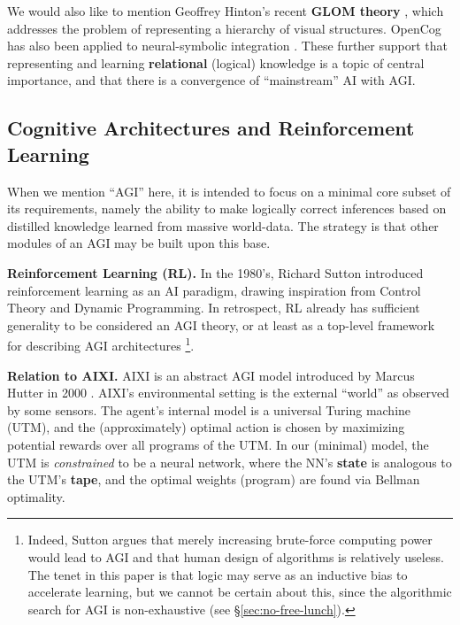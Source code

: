 \documentclass[orivec]{llncs}
\begin{document}
We would also like to mention Geoffrey Hinton's recent \textbf{GLOM theory} \cite{Hinton2021}, which addresses the problem of representing a hierarchy of visual structures.  OpenCog has also been applied to neural-symbolic integration \cite{Goertzel2009} \cite{Potapov2019}.  These further support that representing and learning \textbf{relational} (logical) knowledge is a topic of central importance, and that there is a convergence of ``mainstream'' AI with AGI.

\subsection{Cognitive Architectures and Reinforcement Learning}

When we mention ``AGI'' here, it is intended to focus on a minimal core subset of its requirements, namely the ability to make logically correct inferences based on distilled knowledge learned from massive world-data.  The strategy is that other modules of an AGI may be built upon this base.

\textbf{Reinforcement Learning (RL).}  In the 1980's, Richard Sutton \cite{Sutton1984} introduced reinforcement learning as an AI paradigm, drawing inspiration from Control Theory and Dynamic Programming.  In retrospect, RL already has sufficient generality to be considered an AGI theory, or at least as a top-level framework for describing AGI architectures \footnote{ Indeed, Sutton argues that merely increasing brute-force computing power would lead to AGI and that human design of algorithms is relatively useless.  The tenet in this paper is that logic may serve as an inductive bias to accelerate learning, but we cannot be certain about this, since the algorithmic search for AGI is non-exhaustive (see \S\ref{sec:no-free-lunch}). }.

\textbf{Relation to AIXI.}  AIXI is an abstract AGI model introduced by Marcus Hutter in 2000 \cite{Hutter2005}.  AIXI's environmental setting is the external ``world'' as observed by some sensors.  The agent's internal model is a universal Turing machine (UTM), and the (approximately) optimal action is chosen by maximizing potential rewards over all programs of the UTM.  In our (minimal) model, the UTM is \textit{constrained} to be a neural network, where the NN's \textbf{state} is analogous to the UTM's \textbf{tape}, and the optimal weights (program) are found via Bellman optimality.
\end{document}
